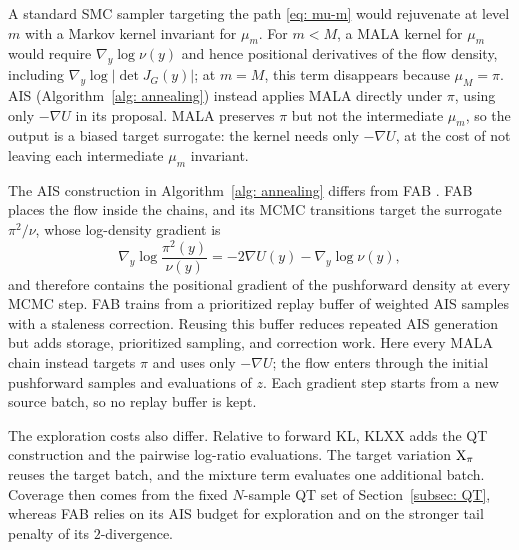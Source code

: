 \documentclass{article}
\begin{document}
\begin{algorithm}[htb]
	\caption{Annealed importance sampling (AIS) for a biased target surrogate}
	\label{alg: annealing}
	
\end{algorithm}
\medskip
\noindent
A standard SMC sampler targeting the path \eqref{eq: mu-m} would rejuvenate at level $m$ with a Markov kernel invariant for $\mu_m$. For $m<M$, a MALA kernel for $\mu_m$ would require $\nabla_y\log\nu(y)$ and hence positional derivatives of the flow density, including $\nabla_y\log|\det J_G(y)|$; at $m=M$, this term disappears because $\mu_M=\pi$. AIS (Algorithm~\ref{alg: annealing}) instead applies MALA directly under $\pi$, using only $-\nabla U$ in its proposal. MALA preserves $\pi$ but not the intermediate $\mu_m$, so the output is a biased target surrogate: the kernel needs only $-\nabla U$, at the cost of not leaving each intermediate $\mu_m$ invariant.

The AIS construction in Algorithm~\ref{alg: annealing} differs from FAB \citep{midgley2022flow}. FAB places the flow inside the chains, and its MCMC transitions target the surrogate $\pi^2/\nu$, whose log-density gradient is
\begin{equation*}
	\nabla_y \log \frac{\pi^2(y)}{\nu(y)} = -2\nabla U(y) - \nabla_y \log\nu(y),
\end{equation*}
and therefore contains the positional gradient of the pushforward density at every MCMC step. FAB trains from a prioritized replay buffer of weighted AIS samples with a staleness correction. Reusing this buffer reduces repeated AIS generation but adds storage, prioritized sampling, and correction work. Here every MALA chain instead targets $\pi$ and uses only $-\nabla U$; the flow enters through the initial pushforward samples and evaluations of $z$. Each gradient step starts from a new source batch, so no replay buffer is kept.

The exploration costs also differ. Relative to forward KL, KLXX adds the QT construction and the pairwise log-ratio evaluations. The target variation $\mathrm{X}_\pi$ reuses the target batch, and the mixture term evaluates one additional batch. Coverage then comes from the fixed $N$-sample QT set of Section~\ref{subsec: QT}, whereas FAB relies on its AIS budget for exploration and on the stronger tail penalty of its $2$-divergence.
\end{document}
